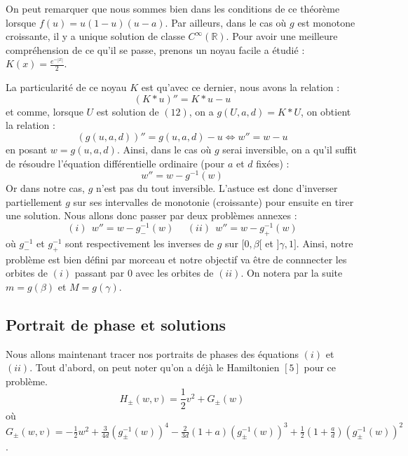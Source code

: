 \documentclass{article}
\begin{document}
On peut remarquer que nous sommes bien dans les conditions de ce théorème lorsque $f(u) = u(1-u)(u-a)$. Par ailleurs, dans le cas où $g$ est monotone croissante, il y a unique solution de classe $C^{\infty}(\mathbb{R})$.
Pour avoir une meilleure compréhension de ce qu'il se passe, prenons un noyau facile a étudié : $K(x) = \frac{e^{-|x|}}{2}$.\newline 

La particularité de ce noyau $K$ est qu'avec ce dernier, nous avons la relation :
\begin{equation*}
	(K*u)'' = K*u-u
\end{equation*}
et comme, lorsque $U$ est solution de $(12)$, on a $g(U,a,d) = K*U$, on obtient la relation : 
\begin{equation}
 	(g(u,a,d))'' = g(u,a,d) - u  \Leftrightarrow w'' = w - u 
\end{equation}
en posant $w=g(u,a,d)$.
Ainsi, dans le cas où $g$ serai inversible, on a qu'il suffit de résoudre l'équation différentielle ordinaire (pour $a$ et $d$ fixées) :
\begin{equation}
	w'' = w - g^{-1}(w)
\end{equation}
Or dans notre cas, $g$ n'est pas du tout inversible. L'astuce est donc d'inverser partiellement $g$ sur ses intervalles de monotonie (croissante) pour ensuite en tirer une solution. Nous allons donc passer par deux problèmes annexes : 
\begin{equation*}
	(i)~~ w'' = w - g_-^{-1}(w) ~~~~~~ (ii)~~ w'' = w - g_+^{-1}(w)
\end{equation*}
où $g_-^{-1}$ et $g_+^{-1}$ sont respectivement les inverses de $g$ sur $[0, \beta[$ et $]\gamma, 1]$. Ainsi, notre problème est bien défini par morceau et notre objectif va être de connnecter les orbites de $(i)$ passant par $0$ avec les orbites de $(ii)$. On notera par la suite $m = g(\beta)$ et $M = g(\gamma)$.

\subsection{Portrait de phase et solutions}

Nous allons maintenant tracer nos portraits de phases des équations $(i)$ et $(ii)$. Tout d'abord, on peut noter qu'on a déjà le Hamiltonien $[5]$ pour ce problème. 
\begin{equation}
	H_{\pm}(w,v) = \frac{1}{2} v^2 + G_{\pm}(w) 
\end{equation}
où $ G_{\pm}(w,v) = -\frac{1}{2} w^2 + \frac{3}{4d} (g_{\pm}^{-1}(w))^4 - \frac{2}{3d}(1+a)(g_{\pm}^{-1}(w))^3 + \frac{1}{2}(1+\frac{a}{d})(g_{\pm}^{-1}(w))^2$.\newline
\end{document}
